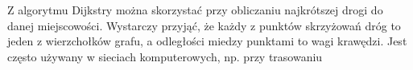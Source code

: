 \documentclass[preview]{standalone}
\begin{document}
\begin{center}
Z algorytmu Dijkstry można skorzystać przy obliczaniu najkrótszej drogi do danej miejscowości. Wystarczy przyjąć, że każdy z punktów skrzyżowań dróg to jeden z wierzchołków grafu, a odległości miedzy punktami to wagi krawędzi. Jest cz\k{e}sto używany w sieciach komputerowych, np. przy trasowaniu
\end{center}
\end{document}
